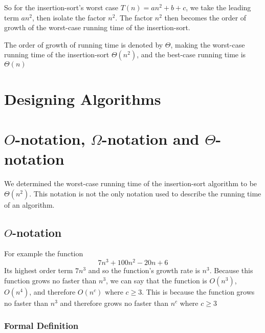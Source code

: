 \documentclass[12pt letter]{report}
\begin{document}
So for the insertion-sort's worst case $T \left( n \right) = an^2 + b + c $, we take the leading term $an^2$, then
isolate the factor $n^2$. The factor $n^2$ then becomes the order of growth of the worst-case running time of the
insertion-sort.

The order of growth of running time is denoted by $\Theta$, making the worst-case running time of the insertion-sort
$\Theta \left( n^2 \right) $, and the best-case running time is $\Theta \left( n \right) $

\section{Designing Algorithms}

\section{$O$-notation, $\Omega$-notation and $\Theta$-notation}

We determined the worst-case running time of the insertion-sort algorithm to be $\Theta \left( n^2 \right) $. This
notation is not the only notation used to describe the running time of an algorithm.

\subsection{$O$-notation}


For example the function
\[
  7n^3 + 100n^2 -20n + 6
\]
Its highest order term $7n^3$ and so the function's growth rate is $n^3$. Because this function grows no faster than
$n^3$, we can say that the function is $O \left( n^3 \right) $, $O \left( n^4 \right) $, and therefore $O \left( n^c \right)
  \text{ where } c\geq 3 $. This is because the function grows no faster than $n^3$ and therefore grows no faster than
$n^c$ where $c \geq 3$

\subsubsection{Formal Definition}
\end{document}
